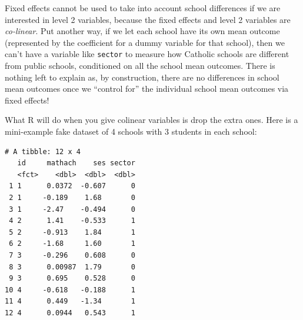 \documentclass[
  letterpaper,
  DIV=11,
  numbers=noendperiod]{scrreprt}
\newenvironment{Shaded}{\begin{snugshade}}{\end{snugshade}}
\newcommand{\AttributeTok}[1]{\textcolor[rgb]{0.49,0.56,0.16}{#1}}
\newcommand{\DecValTok}[1]{\textcolor[rgb]{0.25,0.63,0.44}{#1}}
\newcommand{\FunctionTok}[1]{\textcolor[rgb]{0.02,0.16,0.49}{#1}}
\newcommand{\NormalTok}[1]{\textcolor[rgb]{0.00,0.44,0.13}{#1}}
\newcommand{\OtherTok}[1]{\textcolor[rgb]{0.00,0.44,0.13}{#1}}
\newcommand{\SpecialCharTok}[1]{\textcolor[rgb]{0.25,0.44,0.63}{#1}}
\begin{document}
Fixed effects cannot be used to take into account school differences if
we are interested in level 2 variables, because the fixed effects and
level 2 variables are \emph{co-linear}. Put another way, if we let each
school have its own mean outcome (represented by the coefficient for a
dummy variable for that school), then we can't have a variable like
\texttt{sector} to measure how Catholic schools are different from
public schools, conditioned on all the school mean outcomes. There is
nothing left to explain as, by construction, there are no differences in
school mean outcomes once we ``control for'' the individual school mean
outcomes via fixed effects!

What R will do when you give colinear variables is drop the extra ones.
Here is a mini-example fake dataset of 4 schools with 3 students in each
school:

\begin{Shaded}
\end{Shaded}

\begin{verbatim}
# A tibble: 12 x 4
   id     mathach    ses sector
   <fct>    <dbl>  <dbl>  <dbl>
 1 1      0.0372  -0.607      0
 2 1     -0.189    1.68       0
 3 1     -2.47    -0.494      0
 4 2      1.41    -0.533      1
 5 2     -0.913    1.84       1
 6 2     -1.68     1.60       1
 7 3     -0.296    0.608      0
 8 3      0.00987  1.79       0
 9 3      0.695    0.528      0
10 4     -0.618   -0.188      1
11 4      0.449   -1.34       1
12 4      0.0944   0.543      1
\end{verbatim}
\end{document}
